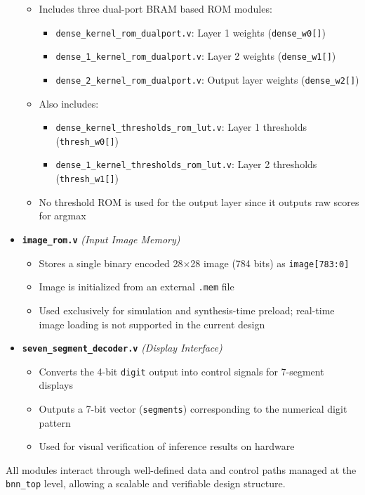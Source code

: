 \documentclass[a4paper,12pt]{report}
\begin{document}
\begin{itemize}
    \begin{itemize}
        \item Includes three dual-port BRAM based ROM modules:
        \begin{itemize}
            \item[\textperiodcentered] \texttt{dense\_kernel\_rom\_dualport.v}: Layer 1 weights (\texttt{dense\_w0[]})
            \item[\textperiodcentered] \texttt{dense\_1\_kernel\_rom\_dualport.v}: Layer 2 weights (\texttt{dense\_w1[]})
            \item[\textperiodcentered] \texttt{dense\_2\_kernel\_rom\_dualport.v}: Output layer weights (\texttt{dense\_w2[]})
        \end{itemize}
        \item Also includes:
        \begin{itemize}
            \item[\textperiodcentered] \texttt{dense\_kernel\_thresholds\_rom\_lut.v}: Layer 1 thresholds (\texttt{thresh\_w0[]})
            \item[\textperiodcentered] \texttt{dense\_1\_kernel\_thresholds\_rom\_lut.v}: Layer 2 thresholds (\texttt{thresh\_w1[]})
        \end{itemize}
        \item No threshold ROM is used for the output layer since it outputs raw scores for argmax
    \end{itemize}
    \item \textbf{\texttt{image\_rom.v}} \textit{(Input Image Memory)}
    \begin{itemize}
        \item Stores a single binary encoded 28$\times$28 image (784 bits) as \texttt{image[783:0]}
        \item Image is initialized from an external \texttt{.mem} file
        \item Used exclusively for simulation and synthesis-time preload; real-time image loading is not supported in the current design
    \end{itemize}
    \item \textbf{\texttt{seven\_segment\_decoder.v}} \textit{(Display Interface)}
    \begin{itemize}
        \item Converts the 4-bit \texttt{digit} output into control signals for 7-segment displays
        \item Outputs a 7-bit vector (\texttt{segments}) corresponding to the numerical digit pattern
        \item Used for visual verification of inference results on hardware
    \end{itemize}
\end{itemize}
All modules interact through well-defined data and control paths managed at the \texttt{bnn\_top} level, allowing a scalable and verifiable design structure.
\end{document}
